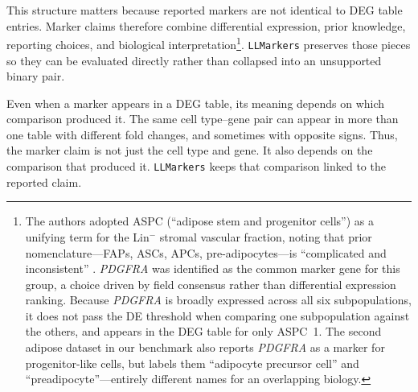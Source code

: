 \documentclass[10pt,twocolumn]{article}
\theoremstyle{plain}
\theoremstyle{definition}
\theoremstyle{remark}
\begin{document}
This structure matters because reported markers are not identical to DEG table entries.  Marker claims therefore combine differential expression, prior knowledge, reporting choices, and biological interpretation\footnote{The authors adopted ASPC (``adipose stem and progenitor cells'') as a unifying term for the Lin$^-$ stromal vascular fraction, noting that prior nomenclature---FAPs, ASCs, APCs, pre-adipocytes---is ``complicated and inconsistent'' \citep{Emont2022}. \textit{PDGFRA} was identified as the common marker gene for this group, a choice driven by field consensus rather than differential expression ranking. Because \textit{PDGFRA} is broadly expressed across all six subpopulations, it does not pass the DE threshold when comparing one subpopulation against the others, and appears in the DEG table for only ASPC~1. The second adipose dataset in our benchmark \citep{Hildreth2021} also reports \textit{PDGFRA} as a marker for progenitor-like cells, but labels them ``adipocyte precursor cell'' and ``preadipocyte''---entirely different names for an overlapping biology. }. \texttt{LLMarkers} preserves those pieces so they can be evaluated directly rather than collapsed into an unsupported binary pair.



Even when a marker appears in a DEG table, its meaning depends on which comparison produced it. The same cell type--gene pair can appear in more than one table with different fold changes, and sometimes with opposite signs.  Thus, the marker claim is not just the cell type and gene. It also depends on the comparison that produced it. \texttt{LLMarkers} keeps that comparison linked to the reported claim.
\end{document}

